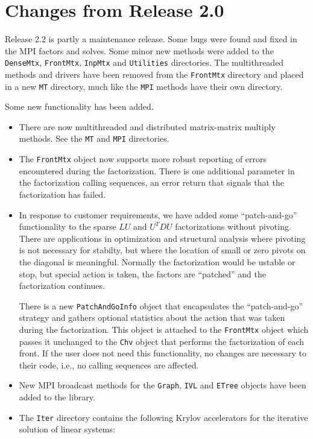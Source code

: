 \section{Changes from Release 2.0}
\label{section:intro:changes-2.0}
\par
Release 2.2 is partly a maintenance release.
Some bugs were found and fixed in the MPI factors and solves.
Some minor new methods were added to the 
{\tt DenseMtx}, {\tt FrontMtx}, {\tt InpMtx}
and {\tt Utilities} directories.
The multithreaded methods and drivers have been removed from the
{\tt FrontMtx} directory and placed in a new {\tt MT} directory,
much like the {\tt MPI} methods have their own directory.
\par
Some new functionality has been added.
\begin{itemize}
\item
There are now multithreaded
and distributed matrix-matrix multiply methods.
See the {\tt MT} and {\tt MPI} directories.
\item
The {\tt FrontMtx} object now supports more robust reporting of
errors encountered during the factorization.
There is one additional parameter in the factorization calling
sequences, an error return that signals that the factorization has
failed.
\item
In response to customer requirements, we have added some
``patch-and-go'' functionality to the sparse $LU$ and $U^TDU$
factorizations without pivoting.
There are applications in optimization and structural analysis
where pivoting is not necessary for stabilty, but where the
location of small or zero pivots on the diagonal is meaningful.
Normally the factorization would be ustable or stop, but special
action is taken, the factors are ``patched'' and the factorization
continues.
\par
There is a new {\tt PatchAndGoInfo} object that encapsulates the
``patch-and-go'' strategy and gathers optional statistics about the
action that was taken during the factorization.
This object is attached to the {\tt FrontMtx} object which passes
it unchanged to the {\tt Chv} object that performs the
factorization of each front.
If the user does not need this functionality, no changes are
necessary to their code, i.e., no calling sequences are affected.
\item
New MPI broadcast methods for the {\tt Graph}, {\tt IVL} and
{\tt ETree} objects have been added to the library.
\item
The {\tt Iter} directory contains the following Krylov accelerators 
for the iterative solution of linear systems:

\end{itemize}
